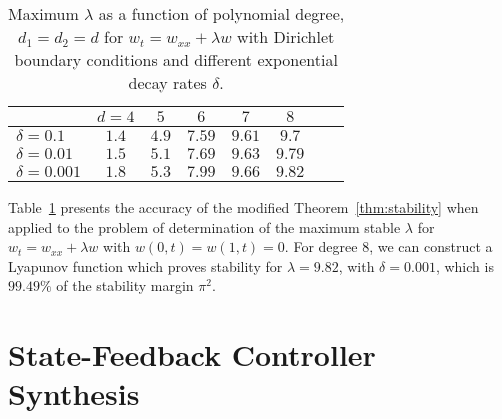 \documentclass[9pt,journal,twocolumn]{IEEEtran}
\begin{document}
\begin{table}{}
\begin{center}
    \begin{tabular}{l *{7}{c}}\hline \hline
 &  $d=4$ & $5$ & $6$ & $7$ & $8$\\ \hline
$\delta=0.1$ &   $1.4$ & $4.9$ & $7.59$ & $9.61$ & $9.7$ \\
$\delta=0.01$ &  $1.5$ & $5.1$ & $7.69$ & $9.63$ & $9.79$ \\
$\delta=0.001$ &  $1.8$ & $5.3$ & $7.99$ & $9.66$ & $9.82$
\end{tabular}
\end{center}
\caption{Maximum $\lambda$ as a function of polynomial degree, $d_1=d_2=d$ for $w_t= w_{xx}+\lambda w$ with Dirichlet boundary conditions and different exponential decay rates $\delta$.}
\label{table_analysis_dirichlet}
\end{table}
 Table~\ref{table_analysis_dirichlet} presents the accuracy of the modified Theorem~\ref{thm:stability} when applied to the problem of determination of the maximum stable $\lambda$ for $w_t=w_{xx}+\lambda w$ with $w(0,t)=w(1,t)=0$. For degree $8$, we can construct a Lyapunov function which proves stability for $\lambda=9.82$, with $\delta=0.001$, which is $99.49 \%$ of the stability margin $\pi^2$.

\section{State-Feedback Controller Synthesis}\label{sec:synthesis}
\end{document}
